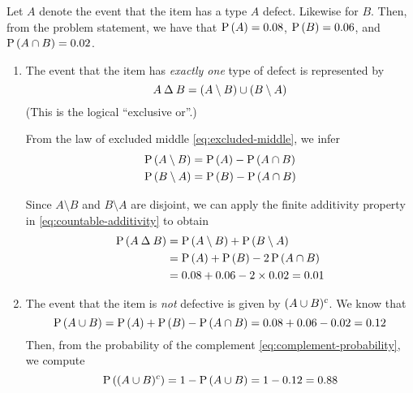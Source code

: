 \documentclass[11pt]{article}
\begin{document}
\begin{solution}
    Let $A$ denote the event that the item has a type $A$ defect.
    Likewise for $B$. Then, from the problem statement, we have that
    $\P{A} = 0.08$, $\P{B} = 0.06$, and $\P{A \intersn B} = 0.02$.

    \begin{enumerate}
        \item
            The event that the item has \emph{exactly one} type of defect is
            represented by
            \begin{equation*}
                A \symdiff B = (A \setminus B) \union (B \setminus A)
            \end{equation*}
            (This is the logical ``exclusive or''.)

            From the law of excluded middle \eqref{eq:excluded-middle}, we
            infer
            \begin{align*}
                \P{A \setminus B} &= \P{A} - \P{A \intersn B} \\
                \P{B \setminus A} &= \P{B} - \P{A \intersn B}
            \end{align*}

            Since $A \setminus B$ and $B \setminus A$ are disjoint, we can
            apply the finite additivity property in
            \eqref{eq:countable-additivity} to obtain
            \begin{align*}
                \P{A \symdiff B}
                &= \P{A \setminus B} + \P{B \setminus A} \\
                &= \P{A} + \P{B}- 2\P{A \intersn B} \\
                &= 0.08 + 0.06 - 2 \times 0.02 = 0.01
            \end{align*}

        \item
            The event that the item is \emph{not} defective is given by
            $(A \union B)^c$. We know that
            \begin{equation*}
                \P{A \union B}
                = \P{A} + \P{B} - \P{A \intersn B}
                = 0.08 + 0.06 - 0.02
                = 0.12
            \end{equation*}
            Then, from the probability of the complement
            \eqref{eq:complement-probability}, we compute
            \begin{equation*}
                \P{(A \union B)^c} = 1 - \P{A \union B} = 1 - 0.12 = 0.88
            \end{equation*}

    \end{enumerate}
\end{solution}
\end{document}
